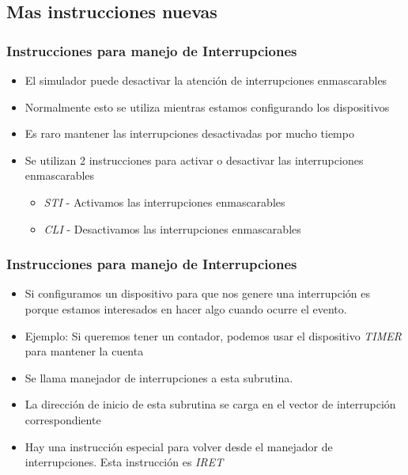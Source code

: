 \documentclass{beamer}
\begin{document}
\subsection{Mas instrucciones nuevas}
\begin{frame}
\frametitle{Instrucciones para  manejo de Interrupciones}

\begin{itemize}

 \item El simulador puede desactivar la atención de interrupciones enmascarables
 \item Normalmente esto se utiliza mientras estamos configurando los dispositivos
 \item Es raro mantener las interrupciones desactivadas por mucho tiempo
 \item Se utilizan 2 instrucciones para activar o desactivar las interrupciones enmascarables 
\begin{itemize}
\item \emph{STI} - Activamos las interrupciones enmascarables
 \item \emph{CLI} - Desactivamos las interrupciones enmascarables
\end{itemize}
\end{itemize}

\end{frame}

\begin{frame}
\frametitle{Instrucciones para  manejo de Interrupciones}

\begin{itemize}

 \item Si configuramos un dispositivo para que nos genere una interrupción es porque estamos interesados en hacer algo cuando ocurre el evento.
 \item Ejemplo: Si queremos tener un contador, podemos usar el dispositivo \emph{TIMER} para mantener la cuenta
 \item Se llama manejador de interrupciones a esta subrutina.
 \item La dirección de inicio de esta subrutina se carga en el vector de interrupción correspondiente
 \item Hay una instrucción especial para volver desde el manejador de interrupciones. Esta instrucción es \emph{IRET}
\end{itemize}

\end{frame}
\end{document}
